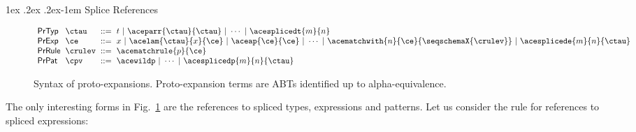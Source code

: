 \documentclass[acmsmall]{acmart}
\makeatletter
\renewcommand{\paragraph}{%
  \@startsection{paragraph}{4}%
  {\z@}{1ex \@plus .2ex \@minus .2ex}{-1em}%
  {\normalfont\normalsize\bfseries}%
}
\makeatother
\begin{document}
\paragraph{Splice References} 
\begin{figure}
\begin{minipage}{\textwidth}
\small
$\arraycolsep=3pt\begin{array}{llcl}
\mathsf{PrTyp} & \ctau & ::= & t ~\vert~
\aceparr{\ctau}{\ctau} ~\vert~ \cdots ~\vert~
\acesplicedt{m}{n}\\
\mathsf{PrExp} & \ce & ::= & x ~\vert~
\acelam{\ctau}{x}{\ce} ~\vert~
\aceap{\ce}{\ce} ~\vert~
\cdots ~\vert~ 
\acematchwith{n}{\ce}{\seqschemaX{\crulev}} ~\vert~
\acesplicede{m}{n}{\ctau}\\
\mathsf{PrRule} & \crulev & ::= & \acematchrule{p}{\ce}\\
\mathsf{PrPat} & \cpv & ::= & \acewildp ~\vert~
\cdots ~\vert~
\acesplicedp{m}{n}{\ctau} 
\end{array}$
\end{minipage}
\caption[Syntax of proto-types and proto-expressions]{Syntax of proto-expansions. Proto-expansion terms are ABTs identified up to alpha-equivalence.}
\label{fig:U-candidate-terms}
\end{figure}
The only interesting forms in Fig.~\ref{fig:U-candidate-terms} are the references to spliced types, expressions and patterns. Let us consider the rule for references to spliced expressions:

{\small\begin{mathpar}
\end{mathpar}}
\end{document}
